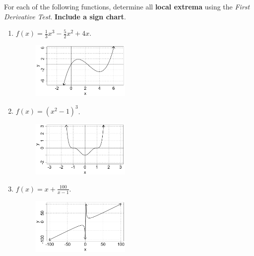 \begin{example}
For each of the following functions, determine all \textbf{local extrema} using the \emph{First Derivative Test}. \textbf{Include a sign chart}.
\renewcommand{\labelenumi}{(\alph{enumi})}
\begin{enumerate}[leftmargin=*]
    \item $f(x)=\displaystyle\frac{1}{3}x^3-\frac{5}{2}x^2+4x$. %
    \begin{figure}[h!]
        \includegraphics[width=0.45\textwidth,inner]{images/optimization/exampleGraph2.png}
        \label{fig:exampleGraph2}
    \end{figure}
    \newpage
    \item $f(x)=(x^2-1)^3$. %
    \begin{figure}[h!]
        \includegraphics[width=0.45\textwidth,inner]{images/optimization/exampleGraph3.png}
        \label{fig:exampleGraph3}
    \end{figure}
    \item $f(x)=x+\displaystyle\frac{100}{x-1}$.\label{1stDervTestLocal_ex7}  %
    \begin{figure}[h!]
        \includegraphics[width=0.45\textwidth,inner]{images/optimization/exampleGraph4.png}

\end{figure}
\end{enumerate}
\end{example}
